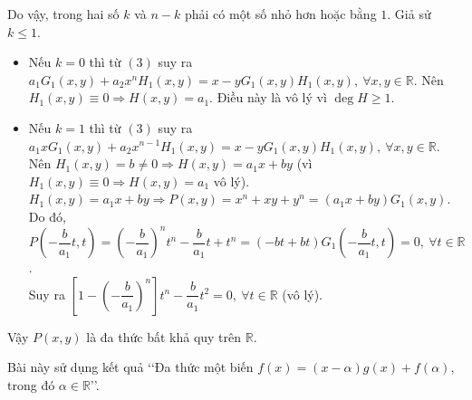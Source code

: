 \begin{bt}[VMO-2011]
{\begin{itemize}
\end{itemize}
Do vậy, trong hai số $ k $ và $ n-k $ phải có một số  nhỏ hơn hoặc bằng $ 1 $. Giả sử $ k\leq 1 $.
\begin{itemize}
	\item Nếu $ k=0 $ thì từ $ (3) $ suy ra $ a_1G_1(x, y)+a_2x^nH_1(x, y)=x-yG_1(x, y)H_1(x, y),\ \forall x, y\in\mathbb{R} $. Nên $ H_1(x, y)\equiv 0\Rightarrow H(x, y)=a_1 $. Điều này là vô lý vì $ \deg H\geq 1 $.
	\item  Nếu $ k=1 $ thì từ $ (3) $ suy ra $ a_1xG_1(x, y)+a_2x^{n-1} H_1(x, y)=x-yG_1(x, y)H_1(x, y),\ \forall x, y\in\mathbb{R} $. Nên $ H_1(x, y)=b\neq 0\Rightarrow H(x, y)=a_1x+by $ (vì $ H_1(x, y)\equiv 0\Rightarrow H(x, y)=a_1 $ vô lý).\\
	$ H_1(x, y)=a_1x+by\Rightarrow P(x, y)=x^n+xy+y^n=\left(a_1x+by\right)G_1(x, y) $.\\
Do đó, $ P\left(-\dfrac{b}{a_1}t, t\right)=\left(-\dfrac{b}{a_1}\right)^nt^n-\dfrac{b}{a_1}t+t^n=(-bt+bt)G_1\left(-\dfrac{b}{a_1}t, t\right)=0,\ \forall t \in\mathbb{R} $.\\
Suy ra $\left[1-\left(-\dfrac{b}{a_1}\right)^n\right]t^n-\dfrac{b}{a_1}t^2=0,\ \forall t\in\mathbb{R}$ (vô lý).
\end{itemize}
Vậy $ P(x, y) $ là đa thức bất khả quy trên $ \mathbb{R} $.  	}
\begin{nx}
	Bài này sử dụng kết quả \lq\lq Đa thức một biến $ f(x)=(x-\alpha)g(x)+f(\alpha) $, trong đó $ \alpha\in\mathbb{R} $\rq\rq.
\end{nx}
\end{bt}
